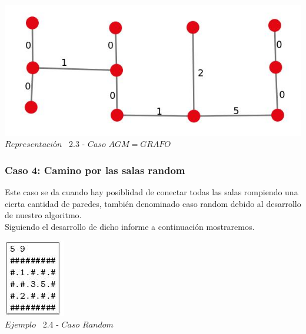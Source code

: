\vspace*{0.3cm} \vspace*{0.3cm}
  \begin{center}
 \includegraphics[scale=0.5]{./EJ2/ej2grafocompleto.jpeg}
 \\{$Representación$ \ 2.3 - $Caso$ $AGM = GRAFO$}
  \end{center}
  \vspace*{0.3cm}


\begin{center}
 \subsubsection*{Caso 4: Camino por las salas random}
\end{center}

Este caso se da cuando hay posiblidad de conectar todas las salas rompiendo una cierta cantidad de paredes, tambi\'en denominado caso random debido al desarrollo de nuestro algoritmo.\\

Siguiendo el desarrollo de dicho informe a continuaci\'on mostraremos.\\
 
\vspace*{0.3cm} \vspace*{0.3cm}
  \begin{center}
 \includegraphics[scale=1.6]{./EJ2/ej2random.jpeg}
\\ {$Ejemplo$ \ 2.4 - $Caso$ $Random$}
  \end{center}
  \vspace*{0.3cm}

